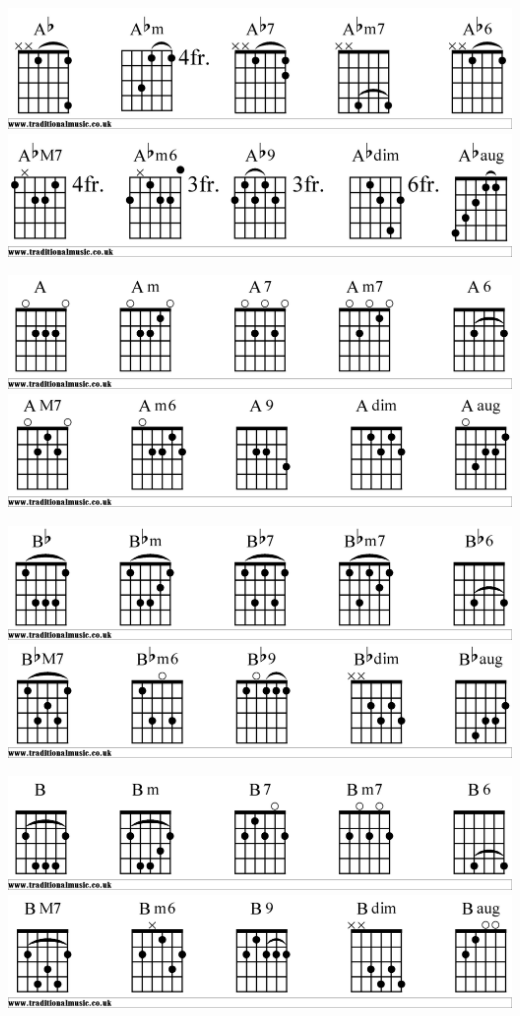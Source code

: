 

\includegraphics[scale=.15]{Abgtr1}
\includegraphics[scale=.15]{Abgtr2}

\includegraphics[scale=.15]{Agtr1}
\includegraphics[scale=.15]{Agtr2}

\includegraphics[scale=.15]{Bbgtr1}
\includegraphics[scale=.15]{Bbgtr2}

\includegraphics[scale=.15]{Bgtr1}
\includegraphics[scale=.15]{Bgtr2}

